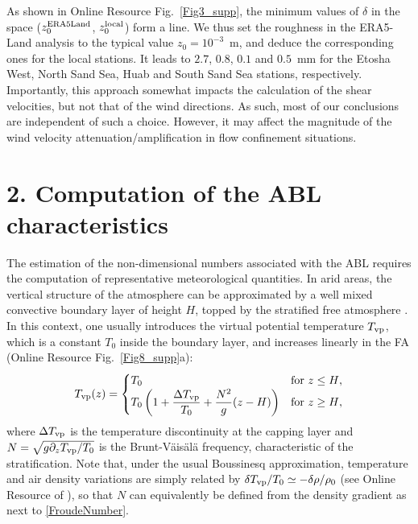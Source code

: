 As shown in Online Resource Fig.~\ref{Fig3_supp}, the minimum values of $\delta$ in the space ($z_{0}^{\textup{ERA5Land}}$, $z_{0}^{\textup{local}}$) form a line. We thus set the roughness in the ERA5-Land analysis to the typical value $z_0=10^{-3}$~m, and deduce the corresponding ones for the local stations. It leads to $2.7$, $0.8$, $0.1$ and $0.5$~mm for the Etosha West, North Sand Sea, Huab and South Sand Sea stations, respectively. Importantly, this approach somewhat impacts the calculation of the shear velocities, but not that of the wind directions. As such, most of our conclusions are independent of such a choice. However, it may affect the magnitude of the wind velocity attenuation/amplification in flow confinement situations.


\section*{2. Computation of the ABL characteristics}

The estimation of the non-dimensional numbers associated with the ABL requires the computation of representative meteorological quantities. In arid areas, the vertical structure of the atmosphere can be approximated by a well mixed convective boundary layer of height $H$, topped by the stratified free atmosphere \citep{Stull1988, Shao2008}. In this context, one usually introduces the virtual potential temperature $T_{\textup{vp}}$, which is a constant $T_{0}$ inside the boundary layer, and increases linearly in the FA (Online Resource Fig.~\ref{Fig8_supp}a):
%
\begin{equation}
T_{\textup{vp}}(z) =
\begin{cases}
T_{0} &\text{for $z \leq H$},\\
T_{0}\left(1 + \displaystyle\frac{\Delta T_{\textup{vp}}}{T_{0}} + \frac{N^{2}}{g}(z - H)\right) &\text{for $ z \geq H$},
\end{cases}
\label{TvpVerticalProfile}
\end{equation}
%
where $\Delta T_{\textup{vp}}$ is the temperature discontinuity at the capping layer and $N = \sqrt{g \partial_z T_{\textup{vp}} / T_{0}}$ is the Brunt-V\"ais\"al\"a frequency, characteristic of the stratification. Note that, under the usual Boussinesq approximation, temperature and air density variations are simply related by $\delta T_{\textup{vp}}/T_{0} \simeq - \delta\rho/\rho_{0}$ (see Online Resource of \citet{Andreotti2009}), so that $N$ can equivalently be defined from the density gradient as next to \eqref{FroudeNumber}.

